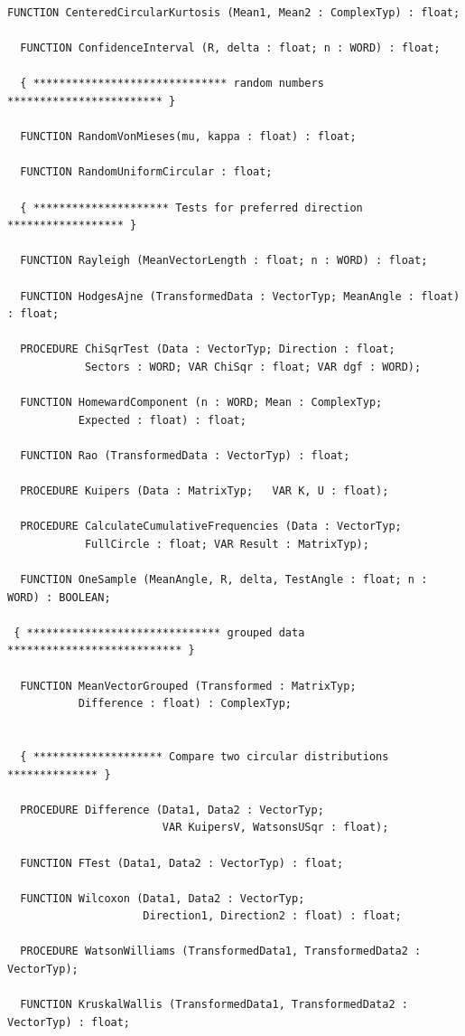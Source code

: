 \begin{refsection}
\begin{lstlisting}[caption=Interface of unit Circular]
  FUNCTION CenteredCircularKurtosis (Mean1, Mean2 : ComplexTyp) : float;

  FUNCTION ConfidenceInterval (R, delta : float; n : WORD) : float;

  { ****************************** random numbers ************************ }

  FUNCTION RandomVonMieses(mu, kappa : float) : float;

  FUNCTION RandomUniformCircular : float;

  { ********************* Tests for preferred direction ****************** }

  FUNCTION Rayleigh (MeanVectorLength : float; n : WORD) : float;

  FUNCTION HodgesAjne (TransformedData : VectorTyp; MeanAngle : float) : float;

  PROCEDURE ChiSqrTest (Data : VectorTyp; Direction : float;
            Sectors : WORD; VAR ChiSqr : float; VAR dgf : WORD);

  FUNCTION HomewardComponent (n : WORD; Mean : ComplexTyp;
           Expected : float) : float;

  FUNCTION Rao (TransformedData : VectorTyp) : float;

  PROCEDURE Kuipers (Data : MatrixTyp;   VAR K, U : float);

  PROCEDURE CalculateCumulativeFrequencies (Data : VectorTyp;
            FullCircle : float; VAR Result : MatrixTyp);

  FUNCTION OneSample (MeanAngle, R, delta, TestAngle : float; n : WORD) : BOOLEAN;

 { ****************************** grouped data *************************** }

  FUNCTION MeanVectorGrouped (Transformed : MatrixTyp;
           Difference : float) : ComplexTyp;


  { ******************** Compare two circular distributions ************** }

  PROCEDURE Difference (Data1, Data2 : VectorTyp;
                        VAR KuipersV, WatsonsUSqr : float);

  FUNCTION FTest (Data1, Data2 : VectorTyp) : float;

  FUNCTION Wilcoxon (Data1, Data2 : VectorTyp;
                     Direction1, Direction2 : float) : float;

  PROCEDURE WatsonWilliams (TransformedData1, TransformedData2 : VectorTyp);

  FUNCTION KruskalWallis (TransformedData1, TransformedData2 : VectorTyp) : float;


\end{lstlisting}
\end{refsection}
